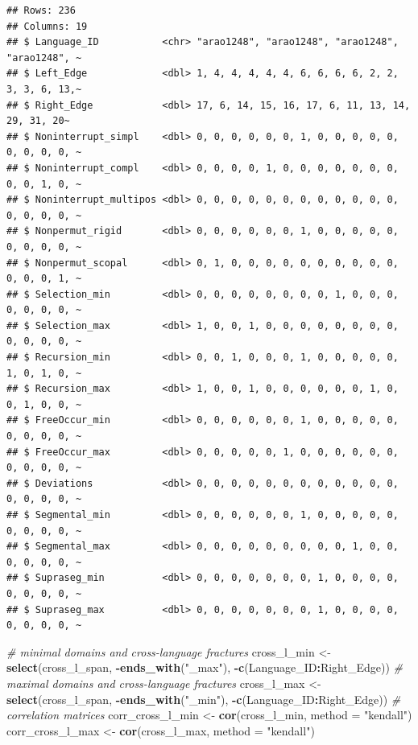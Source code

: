 \documentclass[
]{article}
\newenvironment{Shaded}{\begin{snugshade}}{\end{snugshade}}
\newcommand{\AttributeTok}[1]{\textcolor[rgb]{0.13,0.29,0.53}{#1}}
\newcommand{\CommentTok}[1]{\textcolor[rgb]{0.56,0.35,0.01}{\textit{#1}}}
\newcommand{\FunctionTok}[1]{\textcolor[rgb]{0.13,0.29,0.53}{\textbf{#1}}}
\newcommand{\NormalTok}[1]{#1}
\newcommand{\OtherTok}[1]{\textcolor[rgb]{0.56,0.35,0.01}{#1}}
\newcommand{\SpecialCharTok}[1]{\textcolor[rgb]{0.81,0.36,0.00}{\textbf{#1}}}
\newcommand{\StringTok}[1]{\textcolor[rgb]{0.31,0.60,0.02}{#1}}
\begin{document}
\begin{verbatim}
## Rows: 236
## Columns: 19
## $ Language_ID           <chr> "arao1248", "arao1248", "arao1248", "arao1248", ~
## $ Left_Edge             <dbl> 1, 4, 4, 4, 4, 4, 6, 6, 6, 6, 2, 2, 3, 3, 6, 13,~
## $ Right_Edge            <dbl> 17, 6, 14, 15, 16, 17, 6, 11, 13, 14, 29, 31, 20~
## $ Noninterrupt_simpl    <dbl> 0, 0, 0, 0, 0, 0, 1, 0, 0, 0, 0, 0, 0, 0, 0, 0, ~
## $ Noninterrupt_compl    <dbl> 0, 0, 0, 0, 1, 0, 0, 0, 0, 0, 0, 0, 0, 0, 1, 0, ~
## $ Noninterrupt_multipos <dbl> 0, 0, 0, 0, 0, 0, 0, 0, 0, 0, 0, 0, 0, 0, 0, 0, ~
## $ Nonpermut_rigid       <dbl> 0, 0, 0, 0, 0, 0, 1, 0, 0, 0, 0, 0, 0, 0, 0, 0, ~
## $ Nonpermut_scopal      <dbl> 0, 1, 0, 0, 0, 0, 0, 0, 0, 0, 0, 0, 0, 0, 0, 1, ~
## $ Selection_min         <dbl> 0, 0, 0, 0, 0, 0, 0, 0, 1, 0, 0, 0, 0, 0, 0, 0, ~
## $ Selection_max         <dbl> 1, 0, 0, 1, 0, 0, 0, 0, 0, 0, 0, 0, 0, 0, 0, 0, ~
## $ Recursion_min         <dbl> 0, 0, 1, 0, 0, 0, 1, 0, 0, 0, 0, 0, 1, 0, 1, 0, ~
## $ Recursion_max         <dbl> 1, 0, 0, 1, 0, 0, 0, 0, 0, 0, 1, 0, 0, 1, 0, 0, ~
## $ FreeOccur_min         <dbl> 0, 0, 0, 0, 0, 0, 1, 0, 0, 0, 0, 0, 0, 0, 0, 0, ~
## $ FreeOccur_max         <dbl> 0, 0, 0, 0, 0, 1, 0, 0, 0, 0, 0, 0, 0, 0, 0, 0, ~
## $ Deviations            <dbl> 0, 0, 0, 0, 0, 0, 0, 0, 0, 0, 0, 0, 0, 0, 0, 0, ~
## $ Segmental_min         <dbl> 0, 0, 0, 0, 0, 0, 1, 0, 0, 0, 0, 0, 0, 0, 0, 0, ~
## $ Segmental_max         <dbl> 0, 0, 0, 0, 0, 0, 0, 0, 0, 1, 0, 0, 0, 0, 0, 0, ~
## $ Supraseg_min          <dbl> 0, 0, 0, 0, 0, 0, 0, 1, 0, 0, 0, 0, 0, 0, 0, 0, ~
## $ Supraseg_max          <dbl> 0, 0, 0, 0, 0, 0, 0, 1, 0, 0, 0, 0, 0, 0, 0, 0, ~
\end{verbatim}

\begin{Shaded}
\begin{Highlighting}[]
\CommentTok{\# minimal domains and cross{-}language fractures}
\NormalTok{cross\_l\_min }\OtherTok{\textless{}{-}} \FunctionTok{select}\NormalTok{(cross\_l\_span, }\SpecialCharTok{{-}}\FunctionTok{ends\_with}\NormalTok{(}\StringTok{"\_max"}\NormalTok{), }\SpecialCharTok{{-}}\FunctionTok{c}\NormalTok{(Language\_ID}\SpecialCharTok{:}\NormalTok{Right\_Edge))}
\CommentTok{\# maximal domains and cross{-}language fractures}
\NormalTok{cross\_l\_max }\OtherTok{\textless{}{-}} \FunctionTok{select}\NormalTok{(cross\_l\_span, }\SpecialCharTok{{-}}\FunctionTok{ends\_with}\NormalTok{(}\StringTok{"\_min"}\NormalTok{), }\SpecialCharTok{{-}}\FunctionTok{c}\NormalTok{(Language\_ID}\SpecialCharTok{:}\NormalTok{Right\_Edge))}
\CommentTok{\# correlation matrices}
\NormalTok{corr\_cross\_l\_min }\OtherTok{\textless{}{-}} \FunctionTok{cor}\NormalTok{(cross\_l\_min, }\AttributeTok{method =} \StringTok{"kendall"}\NormalTok{)}
\NormalTok{corr\_cross\_l\_max }\OtherTok{\textless{}{-}} \FunctionTok{cor}\NormalTok{(cross\_l\_max, }\AttributeTok{method =} \StringTok{"kendall"}\NormalTok{)}
\end{Highlighting}
\end{Shaded}
\end{document}
